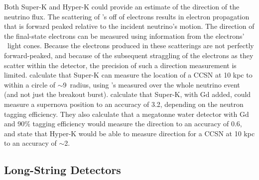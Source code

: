 Both Super-K and Hyper-K could provide an estimate of the direction of the neutrino 
flux.  The scattering of \nue's  off of electrons results in electron 
propagation that is forward peaked relative 
to the incident neutrino's motion.  The direction of
the final-state electrons can be measured using information from the
electrons' \cer\ light cones.  Because the electrons produced in these
scatterings are not perfectly forward-peaked, and because of the
subsequent straggling of the electrons as they scatter within the
detector, the precision of such a direction measurement is
limited.  \cite{andosato2002} calculate that Super-K can measure the
location of a CCSN at 10 kpc to within a circle of
$\sim$9\degree\ radius, using \nue's measured over the whole neutrino
event (and not just the breakout burst).  \cite{tomasetal2003}
calculate that Super-K, with Gd added, could measure a supernova
position to an accuracy of 3.2\degree,
depending on the neutron tagging efficiency.  They also calculate that
a megatonne water detector with Gd and 90\% tagging efficiency would measure
the direction to an accuracy of 0.6\degree, and  \cite{abeetal2011} state
that Hyper-K would be able to measure direction for a CCSN at 10 kpc
to an accuracy of $\sim$2\degree.

\subsection{Long-String Detectors}

